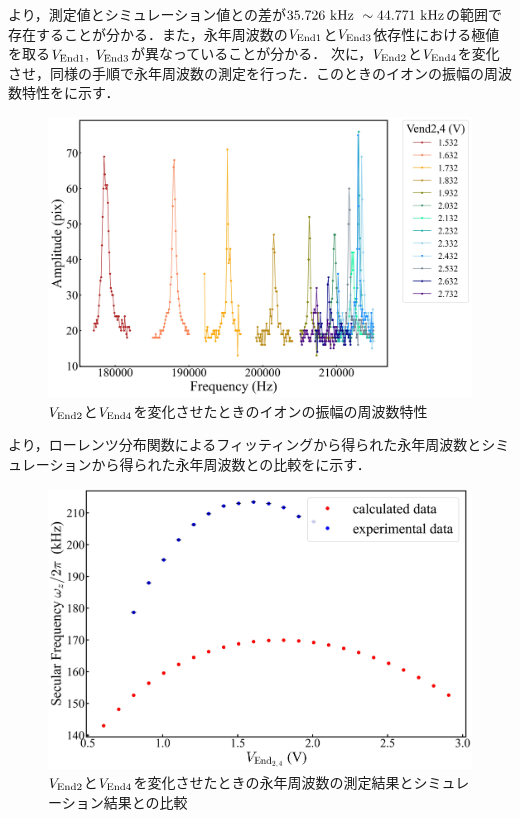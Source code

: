 より，測定値とシミュレーション値との差が$35.726 \ {\rm kHz} \ \sim 44.771 \ {\rm kHz}$の範囲で存在することが分かる．また，永年周波数の$V_{\rm End1}$と$V_{\rm End3}$依存性における極値を取る$V_{\rm End1}, \ V_{\rm End3}$が異なっていることが分かる．
%
\clearpage
%
次に，$V_{\rm End2}$と$V_{\rm End4}$を変化させ，同様の手順で永年周波数の測定を行った．このときのイオンの振幅の周波数特性をに示す．

\begin{figure}[h]
	\begin{center}
		\includegraphics[width = 0.6\linewidth]{./results/figure/end24-SecFreq.jpg}
		\caption{$V_{\rm End2}$と$V_{\rm End4}$を変化させたときのイオンの振幅の周波数特性}
		\label{fig:end24_MeasSec}
	\end{center}
\end{figure}

より，ローレンツ分布関数によるフィッティングから得られた永年周波数とシミュレーションから得られた永年周波数との比較をに示す．

\begin{figure}[h]
	\begin{center}
		\includegraphics[width = 0.6\linewidth]{./results/figure/Vend24-SecFreqZ.jpg}
		\caption{$V_{\rm End2}$と$V_{\rm End4}$を変化させたときの永年周波数の測定結果とシミュレーション結果との比較}
		\label{fig:end24_MeasSec_SimSec}
	\end{center}
\end{figure}

